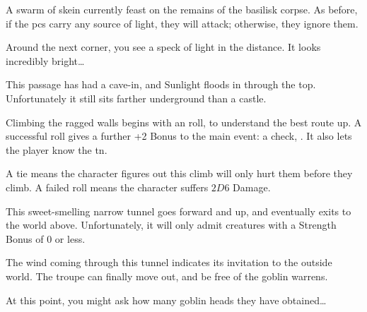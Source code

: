 \begin{multicols}{2}
  A swarm of skein currently feast on the remains of the basilisk corpse.
  As before, if the \glspl{pc} carry any source of light, they will attack; otherwise, they ignore them.

  \skeinSwarm

\fi

\begin{boxtext}
  Around the next corner, you see a speck of light in the distance.
  It looks incredibly bright\ldots
\end{boxtext}


This passage has had a cave-in, and Sunlight floods in through the top.
Unfortunately it still sits farther underground than a castle.

Climbing the ragged walls begins with an  roll, to understand the best route up.
A successful roll gives a further +2 Bonus to the main event: a  check, \tn[14].
It also lets the player know the \gls{tn}.

A tie means the character figures out this climb will only hurt them before they climb.
A failed roll means the character suffers $2D6$ Damage.


This sweet-smelling narrow tunnel goes forward and up, and eventually exits to the world above.
Unfortunately, it will only admit creatures with a Strength Bonus of 0 or less.


The wind coming through this tunnel indicates its invitation to the outside world.
The troupe can finally move out, and be free of the goblin warrens.

At this point, you might ask how many goblin heads they have obtained\ldots

\end{multicols}
